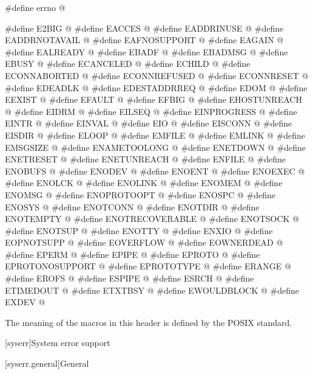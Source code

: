 \begin{codeblock}
#define errno @\seebelow@

#define E2BIG @\seebelow@
#define EACCES @\seebelow@
#define EADDRINUSE @\seebelow@
#define EADDRNOTAVAIL @\seebelow@
#define EAFNOSUPPORT @\seebelow@
#define EAGAIN @\seebelow@
#define EALREADY @\seebelow@
#define EBADF @\seebelow@
#define EBADMSG @\seebelow@
#define EBUSY @\seebelow@
#define ECANCELED @\seebelow@
#define ECHILD @\seebelow@
#define ECONNABORTED @\seebelow@
#define ECONNREFUSED @\seebelow@
#define ECONNRESET @\seebelow@
#define EDEADLK @\seebelow@
#define EDESTADDRREQ @\seebelow@
#define EDOM @\seebelow@
#define EEXIST @\seebelow@
#define EFAULT @\seebelow@
#define EFBIG @\seebelow@
#define EHOSTUNREACH @\seebelow@
#define EIDRM @\seebelow@
#define EILSEQ @\seebelow@
#define EINPROGRESS @\seebelow@
#define EINTR @\seebelow@
#define EINVAL @\seebelow@
#define EIO @\seebelow@
#define EISCONN @\seebelow@
#define EISDIR @\seebelow@
#define ELOOP @\seebelow@
#define EMFILE @\seebelow@
#define EMLINK @\seebelow@
#define EMSGSIZE @\seebelow@
#define ENAMETOOLONG @\seebelow@
#define ENETDOWN @\seebelow@
#define ENETRESET @\seebelow@
#define ENETUNREACH @\seebelow@
#define ENFILE @\seebelow@
#define ENOBUFS @\seebelow@
#define ENODEV @\seebelow@
#define ENOENT @\seebelow@
#define ENOEXEC @\seebelow@
#define ENOLCK @\seebelow@
#define ENOLINK @\seebelow@
#define ENOMEM @\seebelow@
#define ENOMSG @\seebelow@
#define ENOPROTOOPT @\seebelow@
#define ENOSPC @\seebelow@
#define ENOSYS @\seebelow@
#define ENOTCONN @\seebelow@
#define ENOTDIR @\seebelow@
#define ENOTEMPTY @\seebelow@
#define ENOTRECOVERABLE @\seebelow@
#define ENOTSOCK @\seebelow@
#define ENOTSUP @\seebelow@
#define ENOTTY @\seebelow@
#define ENXIO @\seebelow@
#define EOPNOTSUPP @\seebelow@
#define EOVERFLOW @\seebelow@
#define EOWNERDEAD @\seebelow@
#define EPERM @\seebelow@
#define EPIPE @\seebelow@
#define EPROTO @\seebelow@
#define EPROTONOSUPPORT @\seebelow@
#define EPROTOTYPE @\seebelow@
#define ERANGE @\seebelow@
#define EROFS @\seebelow@
#define ESPIPE @\seebelow@
#define ESRCH @\seebelow@
#define ETIMEDOUT @\seebelow@
#define ETXTBSY @\seebelow@
#define EWOULDBLOCK @\seebelow@
#define EXDEV @\seebelow@
\end{codeblock}

\pnum
The meaning of the macros in this header is defined by the POSIX standard.


[syserr]{System error support}

[syserr.general]{General}

